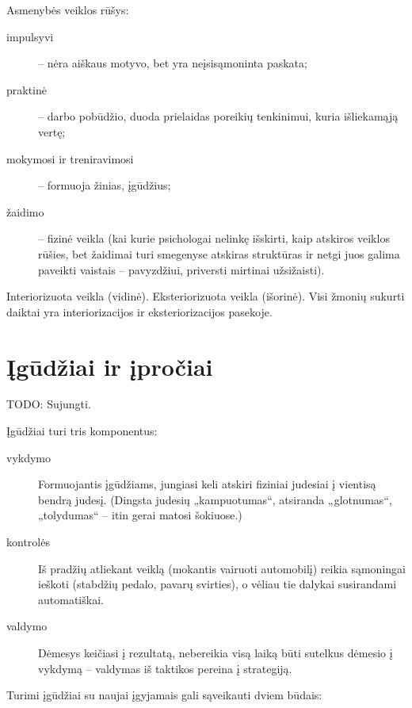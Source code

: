 Asmenybės veiklos rūšys:

\begin{description}
  \item[impulsyvi] – nėra aiškaus motyvo, bet yra neįsisąmoninta paskata;
  \item[praktinė] – darbo pobūdžio, duoda prielaidas poreikių tenkinimui,
    kuria išliekamąją vertę; %
  \item[mokymosi ir treniravimosi] – formuoja žinias, įgūdžius;
  \item[žaidimo] – fizinė veikla (kai kurie psichologai nelinkę išskirti,
    kaip atskiros veiklos rūšies, bet žaidimai turi smegenyse atskiras 
    struktūras ir netgi juos galima paveikti vaistais – pavyzdžiui, 
    priversti mirtinai užsižaisti).
\end{description}

Interiorizuota veikla (vidinė).
Eksteriorizuota veikla (išorinė).
Visi žmonių sukurti daiktai yra interiorizacijos ir eksteriorizacijos
pasekoje.

\section{Įgūdžiai ir įpročiai}

\label{tema:igudziai}

TODO: Sujungti.

Įgūdžiai turi tris komponentus:

\begin{description}
  \item[vykdymo] Formuojantis įgūdžiams, jungiasi keli atskiri fiziniai
    judesiai į vientisą bendrą judesį. (Dingsta judesių „kampuotumas“, 
    atsiranda „glotnumas“, „tolydumas“ – itin gerai matosi šokiuose.)
  \item[kontrolės] 
    Iš pradžių atliekant veiklą (mokantis vairuoti automobilį)
    reikia sąmoningai ieškoti (stabdžių pedalo, pavarų svirties), o vėliau
    tie dalykai susirandami automatiškai.
  \item[valdymo] Dėmesys keičiasi į rezultatą, nebereikia visą laiką
    būti sutelkus dėmesio į vykdymą – valdymas iš taktikos pereina į
    strategiją.
\end{description}

Turimi įgūdžiai su naujai įgyjamais gali sąveikauti dviem būdais:

